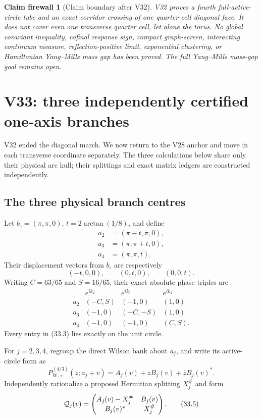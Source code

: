 \documentclass[11pt,oneside]{article}
\newtheorem{firewall}[theorem]{Claim firewall}
\theoremstyle{definition}
\theoremstyle{remark}
\begin{document}
\begin{firewall}[Claim boundary after V32]
\label{fire:newv32-final}
V32 proves a fourth full-active-circle tube and an exact corridor
crossing of one quarter-cell diagonal face.  It does not cover even
one transverse quarter cell, let alone the torus.  No global
covariant inequality, cofinal response sign, compact graph-screen,
interacting continuum measure, reflection-positive limit,
exponential clustering, or Hamiltonian Yang--Mills mass gap has
been proved.  The full Yang--Mills mass-gap goal remains open.
\end{firewall}

\section{V33: three independently certified one-axis branches}
\label{sec:newv33-one-axis}

V32 ended the diagonal march.  We now return to the V28 anchor and
move in each transverse coordinate separately.  The three
calculations below share only their physical arc hull; their
splittings and exact matrix ledgers are constructed independently.

\subsection{The three physical branch centres}

Let \(b_\circ=(\pi,\pi,0)\), \(t=2\arctan(1/8)\), and define
\[
\begin{split}
 a_2&=(\pi-t,\pi,0),\\
 a_3&=(\pi,\pi+t,0),\\
 a_4&=(\pi,\pi,t).
\end{split}                                             \tag{33.1}
\]
Their displacement vectors from \(b_\circ\) are respectively
\[
 (-t,0,0),\qquad(0,t,0),\qquad(0,0,t).                 \tag{33.2}
\]
Writing \(C=63/65\) and \(S=16/65\), their exact absolute phase
triples are
\[
\begin{array}{c|ccc}
 &e^{ik_2}&e^{ik_3}&e^{ik_4}\\ \hline
 a_2&(-C,S)&(-1,0)&(1,0)\\
 a_3&(-1,0)&(-C,-S)&(1,0)\\
 a_4&(-1,0)&(-1,0)&(C,S).
\end{array}                                             \tag{33.3}
\]
Every entry in (33.3) lies exactly on the unit circle.

For \(j=2,3,4\), regroup the direct Wilson bank about \(a_j\), and
write its active-circle form as
\[
 P_{\mathrm W,+}^{(4/3)}(z;a_j+v)
 =A_j(v)+zB_j(v)+\bar zB_j(v)^*.                       \tag{33.4}
\]
Independently rationalize a proposed Hermitian splitting \(X_j^\#\)
and form
\[
 {\cal Q}_j(v)=
 \begin{pmatrix}
 A_j(v)-X_j^\#&B_j(v)\\
 B_j(v)^*&X_j^\#
 \end{pmatrix}.                                        \tag{33.5}
\]
\end{document}
